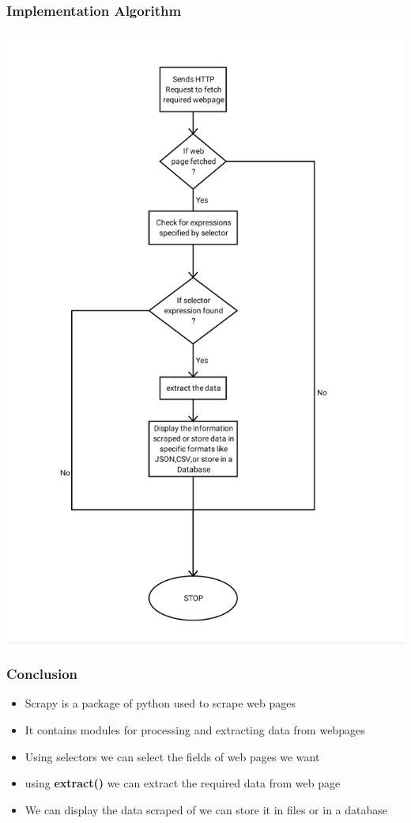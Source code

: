 \documentclass{beamer}
\begin{document}
\begin{frame}
\frametitle{Implementation Algorithm}
\center\includegraphics[scale=.12]{IMG_20191017_083215.jpg} 
\end{frame}

\begin{frame}
\frametitle{Conclusion}
\begin{itemize}
\item Scrapy is a package of python used to scrape web pages
\item It contains modules for processing and extracting data from webpages
\item Using selectors we can select the fields of web pages we want
\item using \textbf{extract()} we can extract the required data from web page
\item We can display the data scraped of we can store it in files or in a database
\end{itemize}
\end{frame}
\end{document}
